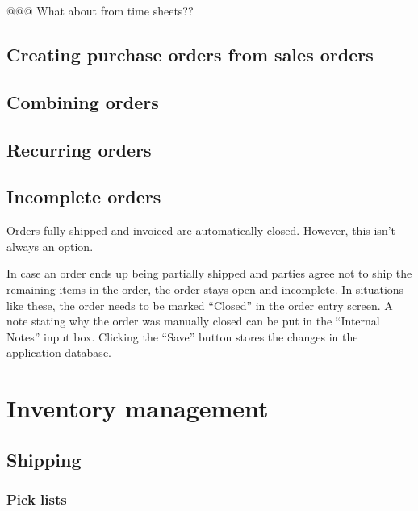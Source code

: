 @@@ What about from time sheets??

\section{Creating purchase orders from sales orders}
\label{sec-workflows-orders-purchase-from-sales}

\section{Combining orders}
\label{sec-workflows-orders-combining}


\section{Recurring orders}
\label{sec-workflows-orders-recurring}


\section{Incomplete orders}
\label{sec-workflows-orders-incomplete}

Orders fully shipped and invoiced are automatically closed. However, this isn't always an option.

In case an order ends up being partially shipped and parties agree not to ship the remaining
items in the order, the order stays open and incomplete. In situations like these, the order
needs to be marked ``Closed'' in the order entry screen. A note stating why the order was manually
closed can be put in the ``Internal Notes'' input box. Clicking the ``Save'' button stores the
changes in the application database.


\chapter{Inventory management}
\label{cha-workflows-inventory}

\section{Shipping}
\label{sec-workflows-inventory-shipping}

\subsection{Pick lists}
\label{subsec-workflows-inventory-shipping-picklist}


